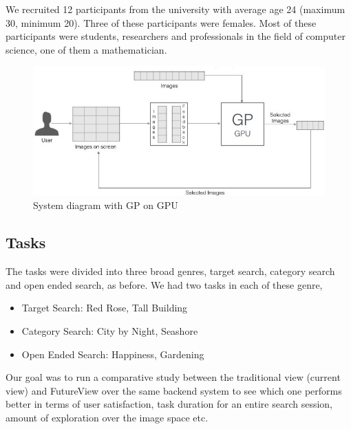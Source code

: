 \documentclass[english]{tktltiki}
\begin{document}
We recruited 12 participants from the university with average age 24 (maximum 30, minimum 20). Three of these participants were females. Most of these participants were students, researchers and professionals in the field of computer science, one of them a mathematician.

\begin{figure}[h!]
  \centering
    \includegraphics[width=1.0\textwidth]{figures/Imse_System_Diagram_2}
    \caption{System diagram with GP on GPU}
    \label{system_diagram_2}
\end{figure}



\subsection{Tasks}

The tasks were divided into three broad genres, target search, category search and open ended search, as before. We had two tasks in each of these genre,

\begin{itemize}
	\item Target Search: Red Rose, Tall Building
	\item Category Search: City by Night, Seashore
	\item Open Ended Search: Happiness, Gardening
\end{itemize}

Our goal was to run a comparative study between the traditional view (current view) and FutureView over the same backend system to see which one performs better in terms of user satisfaction, task duration for an entire search session, amount of exploration over the image space etc.
\end{document}
